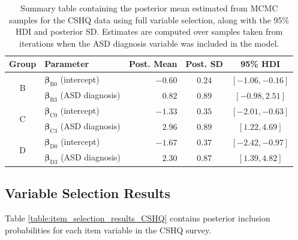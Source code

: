 \documentclass[11pt]{article}
\def\bsbet{\boldsymbol{\beta}}
\theoremstyle{plain}
\theoremstyle{definition}
\begin{document}
\begin{table}[H]
\centering
\begin{tabular}{clrcc}
\hline
\textbf{Group} & \textbf{Parameter} & \textbf{Post. Mean} & \textbf{Post. SD} & \textbf{95\% HDI}  \\
\hline
\multirow{2}{*}{B} & $\bsbet_{\text{B}0}$ (intercept) & $-0.60$  & $0.24$ & $[-1.06,-0.16]$   \\
&$\bsbet_{\text{B}3}$ (ASD diagnosis) & $0.82$ & $0.89$ &  $[-0.98, 2.51]$     \\
\hline
\multirow{2}{*}{C} &$\bsbet_{\text{C}0}$ (intercept) &  $-1.33$ & $0.35$ &  $[-2.01, -0.63]$  \\
&$\bsbet_{\text{C}3}$ (ASD diagnosis) & $2.96$ & $0.89$ &  $[1.22, 4.69]$     \\
\hline
\multirow{2}{*}{D} &$\bsbet_{\text{D}0}$ (intercept) & $-1.67$ & $0.37$ & $[-2.42, -0.97]$   \\
&$\bsbet_{\text{D}3}$ (ASD diagnosis) & $2.30$ & $0.87$ & $[1.39, 4.82] $    \\
\hline
\end{tabular}
\caption{Summary table containing the posterior mean estimated from MCMC samples for the CSHQ data using full variable selection, along with the 95\% HDI and posterior SD. Estimates are computed over samples taken from iterations when the ASD diagnosis variable was included in the model.}\label{table:CSHQ_beta_estimates_varsel}
\end{table}




\subsection{Variable Selection Results}
Table \ref{table:item_selection_results_CSHQ} contains posterior inclusion probabilities for each item variable in the CSHQ survey.
\end{document}
